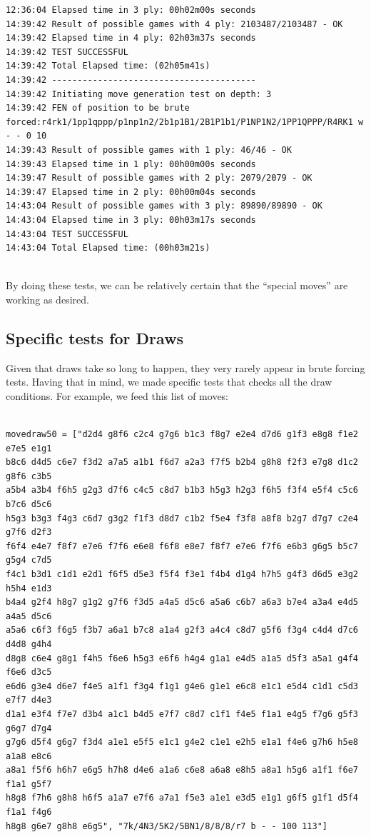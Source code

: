 \documentclass[10pt]{article}
\begin{document}
\begin{lstlisting}
12:36:04 Elapsed time in 3 ply: 00h02m00s seconds
14:39:42 Result of possible games with 4 ply: 2103487/2103487 - OK
14:39:42 Elapsed time in 4 ply: 02h03m37s seconds
14:39:42 TEST SUCCESSFUL
14:39:42 Total Elapsed time: (02h05m41s)
14:39:42 ----------------------------------------
14:39:42 Initiating move generation test on depth: 3
14:39:42 FEN of position to be brute forced:r4rk1/1pp1qppp/p1np1n2/2b1p1B1/2B1P1b1/P1NP1N2/1PP1QPPP/R4RK1 w - - 0 10
14:39:43 Result of possible games with 1 ply: 46/46 - OK
14:39:43 Elapsed time in 1 ply: 00h00m00s seconds
14:39:47 Result of possible games with 2 ply: 2079/2079 - OK
14:39:47 Elapsed time in 2 ply: 00h00m04s seconds
14:43:04 Result of possible games with 3 ply: 89890/89890 - OK
14:43:04 Elapsed time in 3 ply: 00h03m17s seconds
14:43:04 TEST SUCCESSFUL
14:43:04 Total Elapsed time: (00h03m21s)
    
\end{lstlisting}

By doing these tests, we can be relatively certain that the ``special moves'' are working
as desired.

\subsection{Specific tests for Draws}

Given that draws take so long to happen, they very rarely appear in brute forcing
tests. Having that in mind, we made specific tests that checks all the draw
conditions.  For example, we feed this list of moves: 

\begin{lstlisting}

movedraw50 = ["d2d4 g8f6 c2c4 g7g6 b1c3 f8g7 e2e4 d7d6 g1f3 e8g8 f1e2 e7e5 e1g1
b8c6 d4d5 c6e7 f3d2 a7a5 a1b1 f6d7 a2a3 f7f5 b2b4 g8h8 f2f3 e7g8 d1c2 g8f6 c3b5
a5b4 a3b4 f6h5 g2g3 d7f6 c4c5 c8d7 b1b3 h5g3 h2g3 f6h5 f3f4 e5f4 c5c6 b7c6 d5c6
h5g3 b3g3 f4g3 c6d7 g3g2 f1f3 d8d7 c1b2 f5e4 f3f8 a8f8 b2g7 d7g7 c2e4 g7f6 d2f3
f6f4 e4e7 f8f7 e7e6 f7f6 e6e8 f6f8 e8e7 f8f7 e7e6 f7f6 e6b3 g6g5 b5c7 g5g4 c7d5
f4c1 b3d1 c1d1 e2d1 f6f5 d5e3 f5f4 f3e1 f4b4 d1g4 h7h5 g4f3 d6d5 e3g2 h5h4 e1d3
b4a4 g2f4 h8g7 g1g2 g7f6 f3d5 a4a5 d5c6 a5a6 c6b7 a6a3 b7e4 a3a4 e4d5 a4a5 d5c6
a5a6 c6f3 f6g5 f3b7 a6a1 b7c8 a1a4 g2f3 a4c4 c8d7 g5f6 f3g4 c4d4 d7c6 d4d8 g4h4
d8g8 c6e4 g8g1 f4h5 f6e6 h5g3 e6f6 h4g4 g1a1 e4d5 a1a5 d5f3 a5a1 g4f4 f6e6 d3c5
e6d6 g3e4 d6e7 f4e5 a1f1 f3g4 f1g1 g4e6 g1e1 e6c8 e1c1 e5d4 c1d1 c5d3 e7f7 d4e3
d1a1 e3f4 f7e7 d3b4 a1c1 b4d5 e7f7 c8d7 c1f1 f4e5 f1a1 e4g5 f7g6 g5f3 g6g7 d7g4
g7g6 d5f4 g6g7 f3d4 a1e1 e5f5 e1c1 g4e2 c1e1 e2h5 e1a1 f4e6 g7h6 h5e8 a1a8 e8c6
a8a1 f5f6 h6h7 e6g5 h7h8 d4e6 a1a6 c6e8 a6a8 e8h5 a8a1 h5g6 a1f1 f6e7 f1a1 g5f7
h8g8 f7h6 g8h8 h6f5 a1a7 e7f6 a7a1 f5e3 a1e1 e3d5 e1g1 g6f5 g1f1 d5f4 f1a1 f4g6
h8g8 g6e7 g8h8 e6g5", "7k/4N3/5K2/5BN1/8/8/8/r7 b - - 100 113"]

\end{lstlisting}
\end{document}
